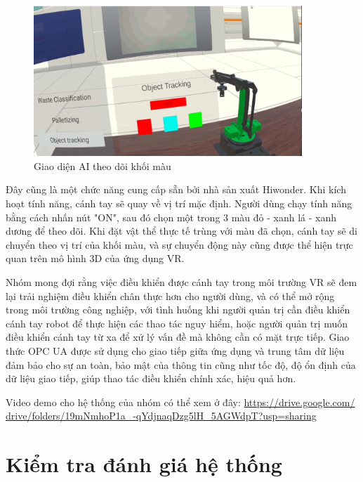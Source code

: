 \begin{figure}[H]
    \centering
    \includegraphics[width=0.9\textwidth]{Images/Result/vr_color_tracking.jpg}
    \caption{Giao diện AI theo dõi khối màu}
    \label{fig:vr_color_tracking}
\end{figure}

Đây cũng là một chức năng cung cấp sẵn bởi nhà sản xuất Hiwonder. Khi kích hoạt tính năng, cánh tay sẽ quay về vị trí mặc định. Người dùng chạy tính năng bằng cách nhấn nút "ON", sau đó chọn một trong 3 màu đỏ - xanh lá - xanh dương để theo dõi. Khi đặt vật thể thực tế trùng với màu đã chọn, cánh tay sẽ di chuyển theo vị trí của khối màu, và sự chuyển động này cũng được thể hiện trực quan trên mô hình 3D của ứng dụng VR.

Nhóm mong đợi rằng việc điều khiển được cánh tay trong môi trường VR sẽ đem lại trải nghiệm điều khiển chân thực hơn cho người dùng, và có thể mở rộng trong môi trường công nghiệp, với tình huống khi người quản trị cần điều khiển cánh tay robot để thực hiện các thao tác nguy hiểm, hoặc người quản trị muốn điều khiển cánh tay từ xa để xử lý vấn đề mà không cần có mặt trực tiếp. Giao thức OPC UA được sử dụng cho giao tiếp giữa ứng dụng và trung tâm dữ liệu đảm bảo cho sự an toàn, bảo mật của thông tin cũng như tốc độ, độ ổn định của dữ liệu giao tiếp, giúp thao tác điều khiển chính xác, hiệu quả hơn.

Video demo cho hệ thống của nhóm có thể xem ở đây: \href{https://drive.google.com/drive/folders/19mNmhoP1a_-qYdjnaqDzg5lH_5AGWdpT?usp=sharing}{https://drive.google.com/\\drive/folders/19mNmhoP1a\_-qYdjnaqDzg5lH\_5AGWdpT?usp=sharing}


\section{Kiểm tra đánh giá hệ thống}

